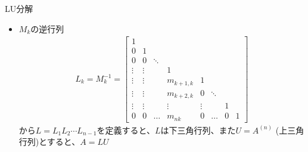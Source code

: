 \begin{frame}[t,fragile]{LU分解}
  \begin{itemize}
  \item $M_k$の逆行列
    \begin{align*}
      L_k = M_k^{-1} = 
      \begin{bmatrix}
        1 & \\
        0 & 1 \\
        0 & 0 & \ddots \\
        \vdots & \vdots & & 1 \\
        \vdots & \vdots & & m_{k+1,k} & 1 & \\
        \vdots & \vdots & & m_{k+2,k} & 0 & \ddots \\
        \vdots & \vdots & & \vdots & \vdots & & 1 & \\
        0 & 0 & \hdots & m_{nk} & 0 & \hdots & 0 & 1
      \end{bmatrix}
    \end{align*}
    から$L=L_1L_2\cdots L_{n-1}$を定義すると、$L$は下三角行列、また$U = A^{(n)}$ (上三角行列)とすると、$A = LU$
  \end{itemize}
\end{frame}
